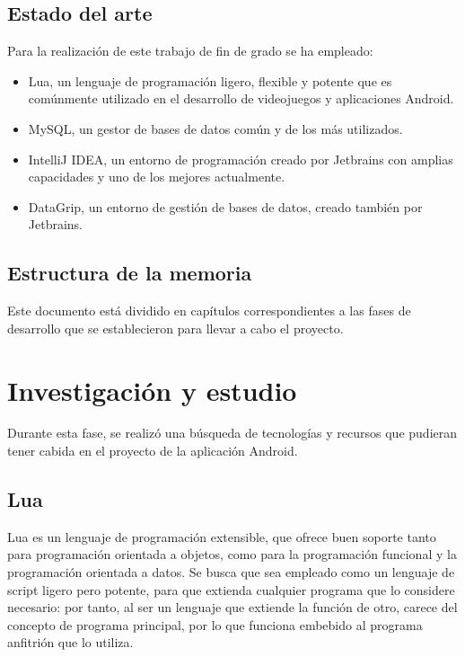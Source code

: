         \newpage


    \section{Estado del arte}

        Para la realización de este trabajo de fin de grado se ha empleado:

        \begin{itemize}

            \item Lua, un lenguaje de programación ligero, flexible y potente que es comúnmente utilizado en el desarrollo de videojuegos y aplicaciones Android.
            \item MySQL, un gestor de bases de datos común y de los más utilizados.
            \item IntelliJ IDEA, un entorno de programación creado por Jetbrains con amplias capacidades y uno de los mejores actualmente.
            \item DataGrip, un entorno de gestión de bases de datos, creado también por Jetbrains.

        \end{itemize}


    \section{Estructura de la memoria}

        Este documento está dividido en capítulos correspondientes a las fases de desarrollo que se establecieron para llevar a cabo el proyecto.


\cleardoublepage



\chapter{Investigación y estudio}

    Durante esta fase, se realizó una búsqueda de tecnologías y recursos que pudieran tener cabida en el proyecto de la aplicación Android.


    \section{Lua}

        Lua es un lenguaje de programación extensible, que ofrece buen soporte tanto para programación orientada a objetos, como para la programación funcional y la programación orientada a datos. Se busca que sea empleado como un lenguaje de script ligero pero potente, para que extienda cualquier programa que lo considere necesario: por tanto, al ser un lenguaje que extiende la función de otro, carece del concepto de programa principal, por lo que funciona embebido al programa anfitrión que lo utiliza.

